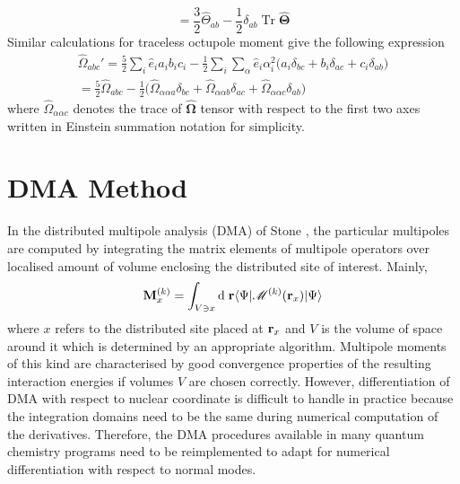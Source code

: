 \documentclass[b5paper,oneside,fleqn,11pt]{book}
\newcommand{\BM}[1]{\bm{#1}}
\begin{document}
\begin{appendices}
\begin{refsection}
\begin{equation}
= \frac{3}{2}\hat{\Theta}_{ab} - \frac{1}{2}\delta_{ab}\;\mathrm{Tr}\;\hat{\BM \Theta}  
\end{equation}
%
Similar calculations for traceless octupole moment give the
following expression
%
\begin{multline}
\hat{\Omega}_{abc}' = \frac{5}{2}\sum_i \hat{e}_ia_ib_ic_i - \frac{1}{2}\sum_i\sum_{\alpha}\hat{e}_i\alpha_i^2 \big(
                                        a_i\delta_{bc} + b_i\delta_{ac} + c_i\delta_{ab}  \big) \\ 
= \frac{5}{2}\hat{\Omega}_{abc} - \frac{1}{2} \big( \hat{\Omega}_{\alpha\alpha a}\delta_{bc} +
                                                \hat{\Omega}_{\alpha\alpha b}\delta_{ac} + 
                                                \hat{\Omega}_{\alpha\alpha c}\delta_{ab}  \big) 
\end{multline}
%
where $\hat{\Omega}_{\alpha\alpha c}$ denotes the trace of $\hat{\BM\Omega}$ 
tensor with respect to the first two axes written in Einstein
summation notation for simplicity. 

\section{DMA Method}

In the distributed multipole analysis 
(DMA) of Stone \citep{Stone.JCTC.2005}, the particular multipoles
are computed by integrating the matrix elements of multipole
operators over localised amount of volume enclosing the distributed
site of interest. Mainly,
%
\begin{equation}
{\bf M}^{(k)}_x  = \int_{V\ni x} {\rm d}\;{\bf r}
   \langle \Psi  \lvert \mathscr{M}^{(k)} ({\bf r}_x) \rvert  \Psi \rangle
\end{equation}
%
where $x$ refers to the distributed site placed at ${\bf r}_x$
and $V$ is the volume of space around it which is
determined by an appropriate algorithm. 
Multipole moments of this kind are characterised by good convergence
properties of the resulting interaction energies
if volumes $V$ are chosen correctly. 
However, differentiation of DMA with respect to nuclear coordinate
is difficult to handle in practice because the integration domains need to be the same
during numerical computation of the derivatives. Therefore, the DMA
procedures available in many quantum chemistry programs 
need to be reimplemented to adapt for numerical differentiation with respect
to normal modes.


\end{refsection}
\end{appendices}
\end{document}
